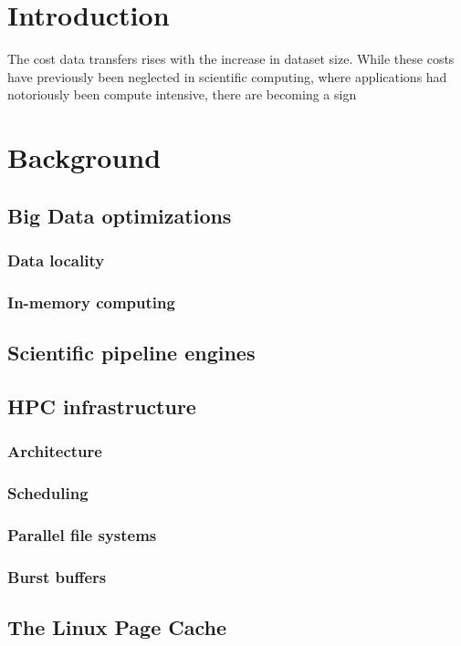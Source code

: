 \documentclass{report}
\begin{document}
    \chapter{Introduction}

    The cost data transfers rises with the increase in dataset size. While these costs
    have previously been neglected in scientific computing, where applications had
    notoriously been compute intensive, there are becoming a sign
    
    \chapter{Background}
        \section{Big Data optimizations}
            \subsection{Data locality}
            \subsection{In-memory computing}
        \section{Scientific pipeline engines}
        \section{HPC infrastructure}
            \subsection{Architecture}
            \subsection{Scheduling}
            \subsection{Parallel file systems}
            \subsection{Burst buffers}
        \section{The Linux Page Cache}
\end{document}

